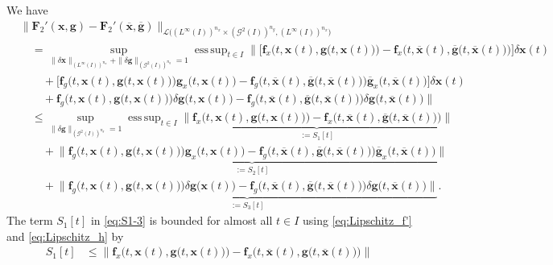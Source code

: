 \documentclass[onefignum,onetabnum]{siamart220329}
\numberwithin{equation}{section}
\DeclareMathOperator*{\esssup}{ess\,sup}
\newcommand{\bff}{\ensuremath{\mathbf{f}}} %
\newcommand{\bg}{\ensuremath{\mathbf{g}}} %
\newcommand{\bx}{\ensuremath{\mathbf{x}}} %
\newcommand{\BF}{\ensuremath{\mathbf{F}} } %
\newcommand {\cG} {\mathcal{G}}
\newcommand {\cL} {\mathcal{L}}
\begin{document}
\begin{appendix}
    
     We have
     \begin{equation}
      \begin{aligned}
     	&\| \BF_2'(\bx, \bg) - \BF_2'(\overline{\bx}, \overline{\bg}) \|_{\cL\big( (L^\infty(I))^{n_x} \times (\cG^2(I))^{n_g}, (L^\infty(I))^{n_x} \big)} \\
     	&\quad = \sup_{\| \delta \bx \|_{(L^\infty(I))^{n_x}}+ \| \delta \bg \|_{(\cG^2(I))^{n_g} } = 1}  \esssup_{t \in I} \Big\| \Big[ \bff_x \Big(t, \bx(t), \bg \big(t, \bx(t) \big) \Big) - \bff_x \Big(t, \overline{\bx}(t), \overline{\bg} \big(t, \overline{\bx}(t) \big) \Big) \Big] \delta \bx(t) \\ 
     	&\qquad+ \Big[ \bff_g \Big(t, \bx(t), \bg \big(t, \bx(t) \big) \Big) \bg_x \big(t, \bx(t) \big) - \bff_g \Big(t, \overline{\bx}(t), \overline{\bg} \big(t, \overline{\bx}(t) \big) \Big) \overline{\bg}_x \big(t, \overline{\bx}(t) \big) \Big] \delta \bx(t) \\
     	&\qquad+ \bff_g \Big(t, \bx(t), \bg \big(t, \bx(t) \big) \Big) \delta \bg \big(t, \bx(t) \big) - \bff_g \Big(t, \overline{\bx}(t), \overline{\bg}(t, \overline{\bx}(t) \big) \Big) \delta \bg \big(t, \overline{\bx}(t) \big)
     	\Big\| \\
     	&\quad \leq \sup_{\| \delta \bg \|_{(\cG^2(I))^{n_g} } = 1}  \esssup_{t \in I} \underbrace{\Big\| \bff_x \Big(t, \bx(t), \bg \big(t, \bx(t) \big) \Big) - \bff_x \Big(t, \overline{\bx}(t), \overline{\bg} \big(t, \overline{\bx}(t) \big) \Big) \Big\|}_{:= S_1[t]} \\ 
     	&\qquad+ \underbrace{\Big\| \bff_g \Big(t, \bx(t), \bg \big(t, \bx(t) \big) \Big) \bg_x \big(t, \bx(t) \big) - \bff_g \Big(t, \overline{\bx}(t), \overline{\bg} \big(t, \overline{\bx}(t) \big) \Big) \overline{\bg}_x \big(t, \overline{\bx}(t) \big) \Big\|}_{:= S_2[t]} \\
     	&\qquad+ \underbrace{\Big\| \bff_g \Big(t, \bx(t), \bg \big(t, \bx(t) \big) \Big) \delta \bg \big(\bx(t) \big) - \bff_g \Big(t, \overline{\bx}(t), \overline{\bg}(t, \overline{\bx}(t) \big) \Big) \delta \bg \big(t, \overline{\bx}(t) \big) \Big\|}_{:= S_3[t]}. \label{eq:S1-3}
     \end{aligned}
     \end{equation}
     The term $S_1[t]$ in \cref{eq:S1-3} is bounded for almost all $t \in I$ using \cref{eq:Lipschitz_f'} and \cref{eq:Lipschitz_h} by
     \begin{align}   \label{eq:S_1[t]_bound}
     	S_1[t] 
     	&\leq \Big\| \bff_x \Big(t, \bx(t), \bg \big(t, \bx(t) \big) \Big) - \bff_x \Big(t, \overline{\bx}(t), \bg \big(t, \overline{\bx}(t) \big) \Big) \Big\| \nonumber \\

\end{align}
\end{appendix}
\end{document}
